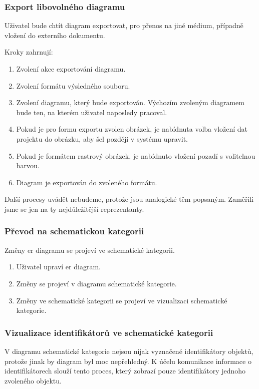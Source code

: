 \subsubsection*{Export libovolného diagramu}

Uživatel bude chtít diagram exportovat, pro přenos na jiné médium, případně vložení do externího dokumentu.

\noindent Kroky zahrnují:
\begin{enumerate}
  \item Zvolení akce exportování diagramu.
  \item Zvolení formátu výsledného souboru.
  \item Zvolení diagramu, který bude exportován.
        Výchozím zvoleným diagramem bude ten, na kterém uživatel naposledy pracoval.
  \item Pokud je pro formu exportu zvolen obrázek, je nabídnuta volba vložení dat projektu do obrázku, aby šel později v systému upravit.
  \item Pokud je formátem rastrový obrázek, je nabídnuto vložení pozadí s volitelnou barvou.
  \item Diagram je exportován do zvoleného formátu.
\end{enumerate}

Další procesy uvádět nebudeme, protože jsou analogické těm popsaným.
Zaměřili jsme se jen na ty nejdůležitější reprezentanty.

\subsubsection*{Převod na schematickou kategorii}

Změny \acrshort{er} diagramu se projeví ve schematické kategorii.

\begin{enumerate}
  \item Uživatel upraví \acrshort{er} diagram.
  \item Změny se projeví v diagramu schematické kategorie.
  \item Změny ve schematické kategorii se projeví ve vizualizaci schematické kategorie.
\end{enumerate}

\subsubsection*{Vizualizace identifikátorů ve schematické kategorii}
V diagramu schematické kategorie nejsou nijak vyznačené identifikátory objektů, protože jinak by diagram byl moc nepřehledný.
K účelu komunikace informace o identifikátorech slouží tento proces, který zobrazí pouze identifikátory jednoho zvoleného objektu.

